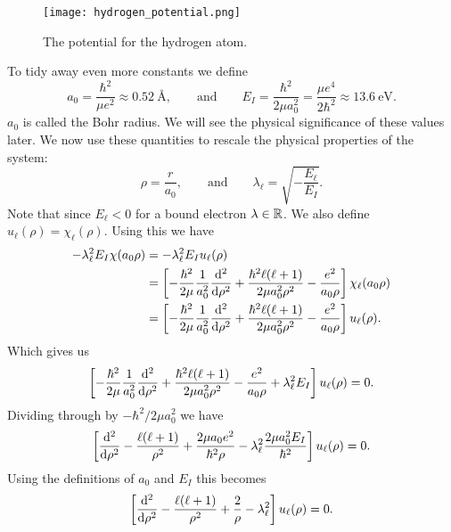 \documentclass[a4paper]{article}
\theoremstyle{definition}
\begin{document}
    
    \begin{figure}[ht]
        \centering
        \texttt{[image: hydrogen\_potential.png]}
        \caption{The potential for the hydrogen atom.}
        \label{fig:hydrogen atom potential}
    \end{figure}

    To tidy away even more constants we define
    \[a_0 = \frac{\hbar^2}{\mu e^2} \approx \SI{0.52}{\angstrom}, \qquad \text{and} \qquad E_I = \frac{\hbar^2}{2\mu a_0^2} = \frac{\mu e^4}{2\hbar^2} \approx \SI{13.6}{\electronvolt}.\]
    \(a_0\) is called the Bohr radius.
    We will see the physical significance of these values later.
    We now use these quantities to rescale the physical properties of the system:
    \[\rho = \frac{r}{a_0}, \qquad\text{and}\qquad \lambda_\ell = \sqrt{-\frac{E_\ell}{E_I}}.\]
    Note that since \(E_\ell < 0\) for a bound electron \(\lambda\in\mathbb{R}\).
    We also define \(u_\ell(\rho) = \chi_\ell(\rho)\).
    Using this we have
    \begin{align*}
        -\lambda_\ell^2E_I\chi(a_0\rho) &= -\lambda_\ell^2E_I u_\ell(\rho)\\
        &= \left[-\frac{\hbar^2}{2\mu}\frac{1}{a_0^2}\dv[2]{\rho} + \frac{\hbar^2\ell(\ell + 1)}{2\mu a_0^2\rho^2} - \frac{e^2}{a_0\rho}\right]\chi_\ell(a_0\rho)\\
        &= \left[-\frac{\hbar^2}{2\mu}\frac{1}{a_0^2}\dv[2]{\rho} + \frac{\hbar^2\ell(\ell + 1)}{2\mu a_0^2\rho^2} - \frac{e^2}{a_0\rho}\right]u_\ell(\rho).
    \end{align*}
    Which gives us
    \[\left[-\frac{\hbar^2}{2\mu}\frac{1}{a_0^2}\dv[2]{\rho} + \frac{\hbar^2\ell(\ell + 1)}{2\mu a_0^2\rho^2} - \frac{e^2}{a_0\rho} + \lambda_\ell^2E_I\right]u_\ell(\rho) = 0.\]
    Dividing through by \(-\hbar^2/2\mu a_0^2\) we have
    \[\left[\dv[2]{\rho} - \frac{\ell(\ell + 1)}{\rho^2} + \frac{2\mu a_0e^2}{\hbar^2\rho} - \lambda_\ell^2\frac{2\mu a_0^2E_I}{\hbar^2}\right]u_\ell(\rho) = 0.\]
    Using the definitions of \(a_0\) and \(E_I\) this becomes
    \[\left[\dv[2]{\rho} - \frac{\ell(\ell + 1)}{\rho^2} + \frac{2}{\rho} - \lambda_\ell^2\right]u_\ell(\rho) = 0.\]
    
\end{document}
